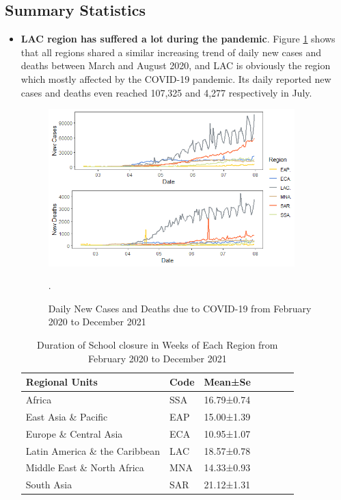 \documentclass{article}
\begin{document}
\subsection{Summary Statistics}
\begin{itemize}
\item \textbf{LAC region has suffered a lot during the pandemic}. Figure \ref{fig:covid-19} shows that all regions shared a similar increasing trend of daily new cases and deaths between March and August 2020, and LAC is obviously the region which mostly affected by the COVID-19 pandemic. Its daily reported new cases and deaths even reached 107,325 and 4,277 respectively in July. 
\begin{figure}[ht!]
\centering
 \includegraphics[width=0.9\textwidth]{covid.png}
\caption{Daily New Cases and Deaths due to COVID-19 from February 2020 to December 2021}.
\label{fig:covid-19}
\end{figure}

\begin{table}[]
\setlength{\belowcaptionskip}{0.2cm}
\label{Tab:2}
\caption{Duration of School closure in Weeks of Each Region from February 2020 to December 2021}
\centering
\begin{tabular}{lllllll}
\hline
Regional Units                 & Code & Mean±Se   \\ \hline
Africa                         & SSA & 16.79±0.74    \\ 
East Asia \& Pacific           & EAP & 15.00±1.39    \\
Europe \& Central Asia         & ECA & 10.95±1.07    \\
Latin America \& the Caribbean & LAC & 18.57±0.78    \\
Middle East \& North Africa    & MNA & 14.33±0.93    \\
South Asia                     & SAR & 21.12±1.31    \\  \hline
\end{tabular}
\label{Tab:school_closed}
\end{table}


\end{itemize}
\end{document}
